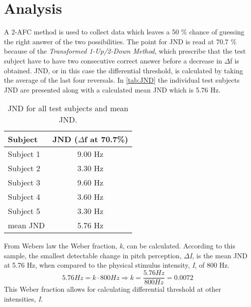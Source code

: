 \section*{Analysis}
%
A 2-AFC method is used to collect data which leaves a 50 \% chance of guessing the right answer of the two possibilities. The point for JND is read at 70.7 \% because of the \textit{Transformed 1-Up/2-Down Method}, which prescribe that the test subject have to have two consecutive correct answer before a decrease in $\Delta$f is obtained.\blankline
%
JND, or in this case the differential threshold, is calculated by taking the average of the last four reversals. In \autoref{tab:JND} the individual test subjects JND are presented along with a calculated mean JND which is 5.76 Hz. 
%
\begin{table}[H]
	\centering
	\begin{tabular}{l|c}
		Subject     & JND ($\Delta$f at 70.7\%) \\\hline
		Subject 1   & 9.00 Hz          \\\hline
		Subject 2   & 3.30 Hz            \\\hline
		Subject 3   & 9.60 Hz              \\\hline
		Subject 4   & 3.60 Hz            \\\hline
		Subject 5   & 3.30 Hz               \\\hline
		mean JND &    5.76 Hz   
	\end{tabular}
	\caption{JND for all test subjects and mean JND.}
	\label{tab:JND}         
\end{table}
\noindent
%
From Webers law the Weber fraction, \textit{k}, can be calculated. According to this sample, the smallest detectable change in pitch perception, \textit{$\Delta$I}, is the mean JND at 5.76 Hz, when compared to the physical stimulus intensity, \textit{I}, of 800 Hz.
% 
\begin{equation}
5.76 Hz = k \cdot 800 Hz \Rightarrow k = \frac{5.76 Hz}{800 Hz} = 0.0072
\end{equation}
%
This Weber fraction allows for calculating differential threshold at other intensities, \textit{I}. 
%
